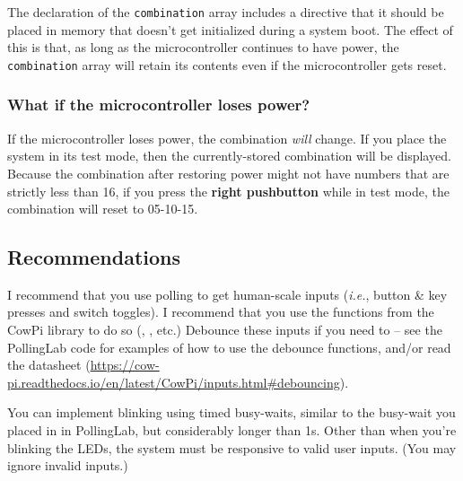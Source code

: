 The declaration of the \lstinline{combination} array includes a directive that it should be placed in memory that doesn't get initialized during a system boot.
The effect of this is that, as long as the microcontroller continues to have power, the \lstinline{combination} array will retain its contents even if the microcontroller gets reset.

\subsubsection*{What if the microcontroller loses power?}

If the microcontroller loses power, the combination \textit{will} change.
If you place the system in its test mode, then the currently-stored combination will be displayed.
Because the combination after restoring power might not have numbers that are strictly less than 16,
if you press the \textbf{right pushbutton} while in test mode, the combination will reset to 05-10-15.


\subsection{Recommendations}

I recommend that you use polling to get human-scale inputs (\textit{i.e.}, button \& key presses and switch toggles).
I recommend that you use the functions from the CowPi library to do so (, , etc.)
Debounce these inputs if you need to -- see the PollingLab code for examples of how to use the debounce functions, and/or read the datasheet (\url{https://cow-pi.readthedocs.io/en/latest/CowPi/inputs.html#debouncing}).

You can implement blinking using timed busy-waits, similar to the busy-wait you placed in  in PollingLab, but considerably longer than 1\textmu s.
Other than when you're blinking the LEDs, the system must be responsive to valid user inputs.
(You may ignore invalid inputs.)
